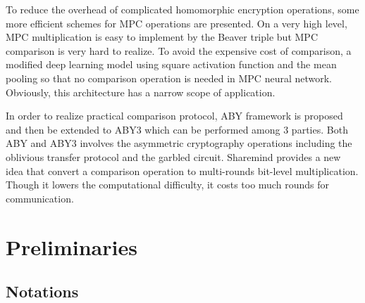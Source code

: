 \documentclass[letterpaper]{article} %
\begin{document}
    To reduce the overhead of complicated homomorphic encryption operations,
    some more efficient schemes for MPC operations are presented.
    On a very high level, MPC multiplication is easy to implement by the Beaver triple \cite{EfficientMultipartyProtocols} 
    but MPC comparison is very hard to realize.
    To avoid the expensive cost of comparison, 
    a modified deep learning model \cite{CryptoNets} using square activation function and the mean pooling so that
    no comparison operation is needed in MPC neural network.
    Obviously, this architecture has a narrow scope of application.

    In order to realize practical comparison protocol, ABY framework \cite{ABY} is proposed
    and then be extended to ABY3 \cite{ABY3} which can be performed among 3 parties.
    Both ABY and ABY3 involves the asymmetric cryptography operations
    including the oblivious transfer protocol and the garbled circuit.
    Sharemind provides a new idea that convert a comparison operation to 
    multi-rounds bit-level multiplication.
    Though it lowers the computational difficulty, it costs too much rounds for
    communication.


    




    


    
\section{Preliminaries}
    \subsection{Notations}
\end{document}
